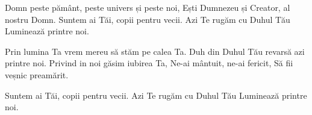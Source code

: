 
\beginverse
Domn peste pământ, peste univers și peste noi,
Ești Dumnezeu și Creator, al nostru Domn.
Suntem ai Tăi, copii pentru vecii.
Azi Te rugăm cu Duhul Tău
Luminează printre noi.
\endverse

\beginverse
Prin lumina Ta vrem mereu să stăm pe calea Ta.
Duh din Duhul Tău revarsă azi printre noi.
Privind in noi găsim iubirea Ta,
Ne-ai mântuit, ne-ai fericit,
Să fii veșnic preamărit.
\endverse

\beginchorus
Suntem ai Tăi, copii pentru vecii.
Azi Te rugăm cu Duhul Tău
Luminează printre noi.
\endchorus

\endsong


